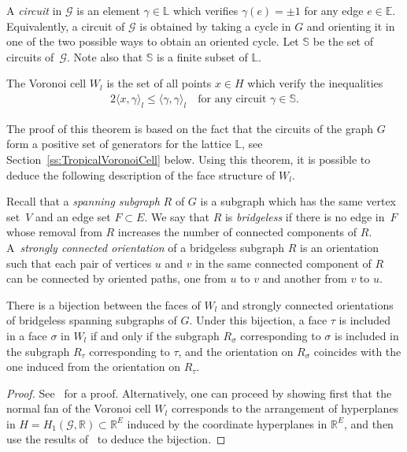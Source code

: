 \documentclass[AHL,Unicode,longabstracts]{cedram}
\newcommand{\innone}[2]{{\langle#2\rangle_{#1}}}
\newcommand{\R}{\mathbb{R}}
\newcommand{\E}{\mathbb{E}}
\renewcommand{\L}{\mathbb{L}}
\renewcommand{\S}{\mathbb{S}}
\newcommand{\mgr}{\mathcal{G}}
\begin{document}
A \emph{circuit} in $\mgr$ is an element $\gamma \in \L$ which verifies $\gamma(e) =\pm 1$ for any edge $e \in \E$. Equivalently, a circuit of $\mgr$ is obtained by taking a cycle in $G$ and orienting it in one of the two possible ways to obtain an oriented cycle. Let $\S$ be the set of circuits of~$\mgr$. Note also that $\S$ is a finite subset of $\L$.
\begin{theo}\label{thm:voronoi_graph}
The Voronoi cell $W_l$ is the set of all points $x \in H$ which verify the inequalities
\begin{align*}
2 \innone{l}{x, \gamma} \leq \innone{l}{\gamma, \gamma} \quad \text{for any circuit } \gamma \in \S.
\end{align*}
\end{theo}

The proof of this theorem is based on the fact that the circuits of the graph $G$ form a positive set of generators for the lattice $\L$, see Section~\ref{ss:TropicalVoronoiCell} below. Using this theorem, it is possible to deduce the following description of the face structure of $W_l$.

Recall that a \emph{spanning subgraph} $R$ of $G$ is a subgraph which has the same vertex set~$V$ and an edge set $F \subset E$. We say that $R$ is \emph{bridgeless} if there is no edge in~$F$ whose removal from $R$ increases the number of connected components of $R$. A~\emph{strongly connected orientation} of a bridgeless subgraph $R$ is an orientation such that each pair of vertices $u$ and $v$ in the same connected component of $R$ can be connected by oriented paths, one from $u$ to $v$ and another from $v$ to $u$.

\begin{theo} \label{thm:face-voronoi-graphs}
There is a bijection between the faces of $W_l$ and strongly connected orientations of bridgeless spanning subgraphs of $G$. Under this bijection, a face $\tau$ is included in a face $\sigma$ in $W_l$ if and only if the subgraph $R_\sigma$ corresponding to $\sigma$ is included in the subgraph $R_\tau$ corresponding to $\tau$, and the orientation on $R_\sigma$ coincides with the one induced from the orientation on $R_\tau$.
\end{theo}

\begin{proof}
See~\cite{Ami10} for a proof. Alternatively, one can proceed by showing first that the normal fan of the Voronoi cell $W_l$ corresponds to the arrangement of hyperplanes in $H = H_1(\mgr, \R) \subset \R^E$ induced by the coordinate hyperplanes in $\R^E$, and then use the results of~\cite[Section~8]{GZ83} to deduce the bijection.
\end{proof}
\end{document}
